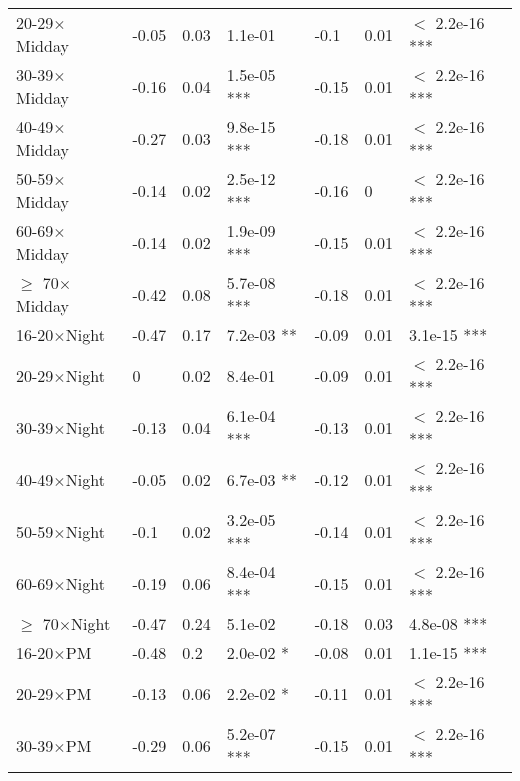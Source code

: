 \documentclass{article}\usepackage[utf8]{inputenc}
\begin{document}
\begin{longtable}[t]{lllllll}
\hspace{1em}20-29$\times$Midday & -0.05 & 0.03 & 1.1e-01 & -0.1 & 0.01 & $<$ 2.2e-16 ***\\
\hspace{1em}30-39$\times$Midday & -0.16 & 0.04 & 1.5e-05 *** & -0.15 & 0.01 & $<$ 2.2e-16 ***\\
\hspace{1em}40-49$\times$Midday & -0.27 & 0.03 & 9.8e-15 *** & -0.18 & 0.01 & $<$ 2.2e-16 ***\\
\hspace{1em}50-59$\times$Midday & -0.14 & 0.02 & 2.5e-12 *** & -0.16 & 0 & $<$ 2.2e-16 ***\\
\hspace{1em}60-69$\times$Midday & -0.14 & 0.02 & 1.9e-09 *** & -0.15 & 0.01 & $<$ 2.2e-16 ***\\
\hspace{1em}$\geq$ 70$\times$Midday & -0.42 & 0.08 & 5.7e-08 *** & -0.18 & 0.01 & $<$ 2.2e-16 ***\\
\hspace{1em}16-20$\times$Night & -0.47 & 0.17 & 7.2e-03 ** & -0.09 & 0.01 & 3.1e-15 ***\\
\hspace{1em}20-29$\times$Night & 0 & 0.02 & 8.4e-01 & -0.09 & 0.01 & $<$ 2.2e-16 ***\\
\hspace{1em}30-39$\times$Night & -0.13 & 0.04 & 6.1e-04 *** & -0.13 & 0.01 & $<$ 2.2e-16 ***\\
\hspace{1em}40-49$\times$Night & -0.05 & 0.02 & 6.7e-03 ** & -0.12 & 0.01 & $<$ 2.2e-16 ***\\
\hspace{1em}50-59$\times$Night & -0.1 & 0.02 & 3.2e-05 *** & -0.14 & 0.01 & $<$ 2.2e-16 ***\\
\hspace{1em}60-69$\times$Night & -0.19 & 0.06 & 8.4e-04 *** & -0.15 & 0.01 & $<$ 2.2e-16 ***\\
\hspace{1em}$\geq$ 70$\times$Night & -0.47 & 0.24 & 5.1e-02 & -0.18 & 0.03 & 4.8e-08 ***\\
\hspace{1em}16-20$\times$PM & -0.48 & 0.2 & 2.0e-02 * & -0.08 & 0.01 & 1.1e-15 ***\\
\hspace{1em}20-29$\times$PM & -0.13 & 0.06 & 2.2e-02 * & -0.11 & 0.01 & $<$ 2.2e-16 ***\\
\hspace{1em}30-39$\times$PM & -0.29 & 0.06 & 5.2e-07 *** & -0.15 & 0.01 & $<$ 2.2e-16 ***\\

\end{longtable}
\end{document}
